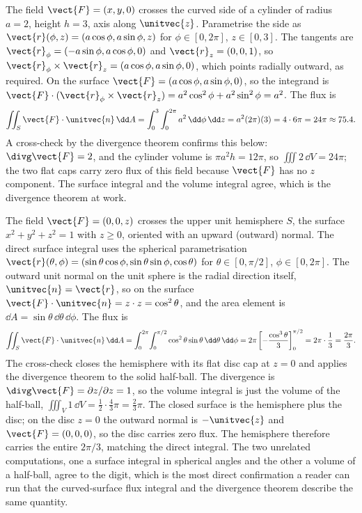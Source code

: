 \begin{example}
The field $\vect{F} = (x, y, 0)$ crosses the curved side of a
cylinder of radius $a = 2$, height $h = 3$, axis along $\unitvec{z}$.
Parametrise the side as $\vect{r}(\phi, z) = (a\cos\phi, a\sin\phi,
z)$ for $\phi \in [0, 2\pi]$, $z \in [0, 3]$. The tangents are
$\vect{r}_{\phi} = (-a\sin\phi, a\cos\phi, 0)$ and $\vect{r}_{z} =
(0, 0, 1)$, so $\vect{r}_{\phi}\times\vect{r}_{z} = (a\cos\phi,
a\sin\phi, 0)$, which points radially outward, as required. On the
surface $\vect{F} = (a\cos\phi, a\sin\phi, 0)$, so the integrand is
$\vect{F}\cdot(\vect{r}_{\phi}\times\vect{r}_{z}) = a^{2}\cos^{2}\phi
+ a^{2}\sin^{2}\phi = a^{2}$. The flux is
\[
\iint_{S}\vect{F}\cdot\unitvec{n}\,\dd A = \int_{0}^{3}\int_{0}^{2\pi}
a^{2}\,\dd\phi\,\dd z = a^{2}(2\pi)(3) = 4\cdot 6\pi = 24\pi
\approx 75.4.
\]
A cross-check by the divergence theorem confirms this below:
$\divg\vect{F} = 2$, and the cylinder volume is $\pi a^{2}h = 12\pi$,
so $\iiint 2\,\dd V = 24\pi$; the two flat caps carry zero flux of
this field because $\vect{F}$ has no $z$ component. The surface
integral and the volume integral agree, which is the divergence
theorem at work.
\end{example}

\begin{example}
The field $\vect{F} = (0, 0, z)$ crosses the upper unit hemisphere
$S$, the surface $x^{2} + y^{2} + z^{2} = 1$ with $z \geq 0$, oriented
with an upward (outward) normal. The direct surface integral uses the
spherical parametrisation $\vect{r}(\theta, \phi) = (\sin\theta\cos\phi,
\sin\theta\sin\phi, \cos\theta)$ for $\theta \in [0, \pi/2]$, $\phi \in
[0, 2\pi]$. The outward unit normal on the unit sphere is the radial
direction itself, $\unitvec{n} = \vect{r}$, so on the surface
$\vect{F}\cdot\unitvec{n} = z\cdot z = \cos^{2}\theta$, and the area
element is $\dd A = \sin\theta\,\dd\theta\,\dd\phi$. The flux is
\[
\iint_{S}\vect{F}\cdot\unitvec{n}\,\dd A = \int_{0}^{2\pi}\!\int_{0}
^{\pi/2}\cos^{2}\theta\sin\theta\,\dd\theta\,\dd\phi = 2\pi\left[
-\frac{\cos^{3}\theta}{3}\right]_{0}^{\pi/2} = 2\pi\cdot\frac{1}{3} =
\frac{2\pi}{3}.
\]
The cross-check closes the hemisphere with its flat disc cap at
$z = 0$ and applies the divergence theorem to the solid half-ball.
The divergence is $\divg\vect{F} = \partial z/\partial z = 1$, so the
volume integral is just the volume of the half-ball,
$\iiint_{V}1\,\dd V = \tfrac{1}{2}\cdot\tfrac{4}{3}\pi = \tfrac{2}{3}
\pi$. The closed surface is the hemisphere plus the disc; on the disc
$z = 0$ the outward normal is $-\unitvec{z}$ and $\vect{F} = (0, 0, 0)$,
so the disc carries zero flux. The hemisphere therefore carries the
entire $2\pi/3$, matching the direct integral. The two unrelated
computations, one a surface integral in spherical angles and the other
a volume of a half-ball, agree to the digit, which is the most direct
confirmation a reader can run that the curved-surface flux integral
and the divergence theorem describe the same quantity.
\end{example}

